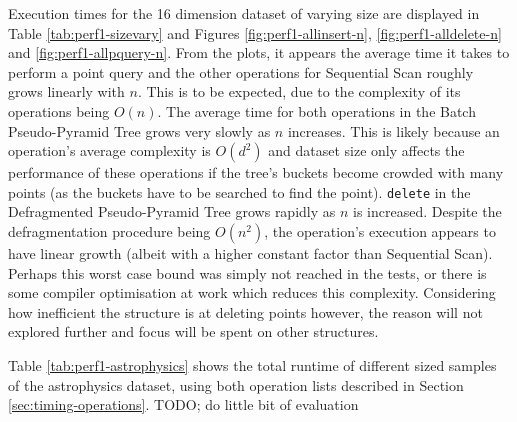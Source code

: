 Execution times for the 16 dimension dataset of varying size are displayed in Table \ref{tab:perf1-sizevary} and Figures \ref{fig:perf1-allinsert-n}, \ref{fig:perf1-alldelete-n} and \ref{fig:perf1-allpquery-n}. From the plots, it appears the average time it takes to perform a point query and the other operations for Sequential Scan roughly grows linearly with $n$. This is to be expected, due to the complexity of its operations being $O(n)$. The average time for both operations in the Batch Pseudo-Pyramid Tree grows very slowly as $n$ increases. This is likely because an operation's average complexity is $O(d^2)$ and dataset size only affects the performance of these operations if the tree's buckets become crowded with many points (as the buckets have to be searched to find the point). \texttt{delete} in the Defragmented Pseudo-Pyramid Tree grows rapidly as $n$ is increased. Despite the defragmentation procedure being $O(n^2)$, the operation's execution appears to have linear growth (albeit with a higher constant factor than Sequential Scan). Perhaps this worst case bound was simply not reached in the tests, or there is some compiler optimisation at work which reduces this complexity. Considering how inefficient the structure is at deleting points however, the reason will not explored further and focus will be spent on other structures.

Table \ref{tab:perf1-astrophysics} shows the total runtime of different sized samples of the astrophysics dataset, using both operation lists described in Section \ref{sec:timing-operations}.
TODO; do little bit of evaluation

